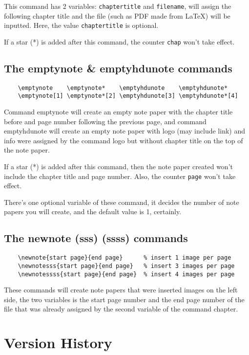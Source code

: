 \documentclass[11pt]{article}
\def\cmd#1{\texorpdfstring{\textcolor{cmdcolor}{\textsf{#1}}}{“#1”}}
\begin{document}
This command has 2 variables: \verb|chaptertitle| and \verb|filename|, will assign the following chapter title and the file (such as PDF made from \textsf\LaTeX{}) will be inputted. Here, the value \verb|chaptertitle| is optional.

If a star (*) is added after this command, the counter \verb|chap| won't take effect.

\subsection{The \cmd{emptynote} \& \cmd{emptyhdunote} commands}
\begin{verbatim}
    \emptynote    \emptynote*    \emptyhdunote    \emptyhdunote*
    \emptynote[1] \emptynote*[2] \emptyhdunote[3] \emptyhdunote*[4]
\end{verbatim}

Command \cmd{emptynote} will create an empty note paper with the chapter title before and page number following the previous page, and command \cmd{emptyhdunote} will create an empty note paper with logo (may include link) and info were assigned by the command \cmd{logo} but without chapter title on the top of the note paper.

If a star (*) is added after this command, then the note paper created won't include the chapter title and page number. Also, the counter \verb|page| won't take effect.

There's one optional variable of these command, it decides the number of note papers you will create, and the default value is 1, certainly.

\subsection{The \cmd{newnote (sss) (ssss)} commands}
\begin{verbatim}
    \newnote{start page}{end page}      % insert 1 image per page
    \newnotesss{start page}{end page}   % insert 3 images per page
    \newnotessss{start page}{end page}  % insert 4 images per page
\end{verbatim}

These commands will create note papers that were inserted images on the left side, the two variables is the start page number and the end page number of the file that was already assigned by the second variable of the command \cmd{chapter}.

\section{Version History}
\end{document}
